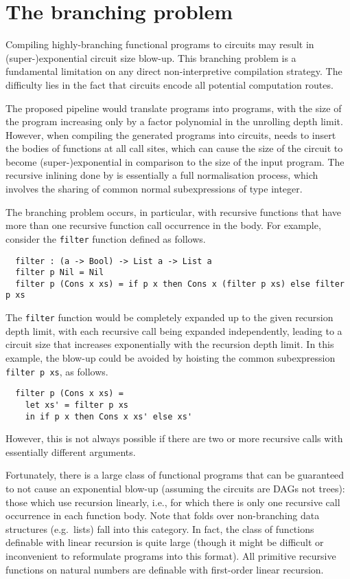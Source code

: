 \documentclass[
    9pt,            %
    techreport,        %
    affiltop,       %
]{art}
\begin{document}
\section{The branching problem}\label{sec_branching}

Compiling highly-branching functional programs to circuits may result
in (super-)exponential circuit size blow-up. This branching problem is
a fundamental limitation on any direct non-interpretive compilation
strategy. The difficulty lies in the fact that circuits encode all potential computation routes.

The proposed pipeline would translate \Juvix{} programs into \VampIR{}
programs, with the size of the program increasing only by a factor polynomial in the unrolling depth limit. However, when compiling the generated programs into circuits, \VampIR{} needs to insert the bodies of functions at all call sites, which can cause the size of the circuit to become (super-)exponential in comparison to the size of the \VampIR{} input program. The recursive inlining done by \VampIR{} is essentially a full
normalisation process, which involves the sharing of common normal
subexpressions of type integer.

The branching problem occurs, in particular, with recursive functions
that have more than one recursive function call occurrence in the
body. For example, consider the \texttt{filter} function defined as follows.

\begin{verbatim}
  filter : (a -> Bool) -> List a -> List a
  filter p Nil = Nil
  filter p (Cons x xs) = if p x then Cons x (filter p xs) else filter p xs
\end{verbatim}

The \texttt{filter} function would be completely expanded up to the given 
recursion depth limit, with each recursive call being expanded independently,
leading to a circuit size that increases exponentially with the recursion depth limit.
In this example, the blow-up could be avoided by hoisting the common
subexpression \texttt{filter p xs}, as follows.
\begin{verbatim}
  filter p (Cons x xs) =
    let xs' = filter p xs
    in if p x then Cons x xs' else xs'
\end{verbatim}
However, this is not always possible if there are two or more
recursive calls with essentially different arguments.

Fortunately, there is a large class of functional programs that can be
guaranteed to not cause an exponential blow-up (assuming the circuits
are DAGs not trees): those which use recursion linearly, i.e., for
which there is only one recursive call occurrence in each function
body. Note that folds over non-branching data structures (e.g.~lists)
fall into this category. In fact, the class of functions definable
with linear recursion is quite large (though it might be difficult or
inconvenient to reformulate programs into this format). All primitive
recursive functions on natural numbers are definable with first-order
linear recursion.
\end{document}
